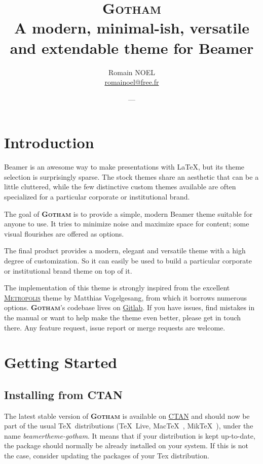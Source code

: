 \documentclass{l3doc}
\title{\textsc{Gotham}\\ A modern, minimal-ish, versatile and extendable theme for Beamer}
\author{Romain NOEL \\ \url{romainoel@free.fr}}
\date{\GothamVersion~---~\GothamDate}
\providecommand{\themename}{\textbf{\textsc{Gotham}}\xspace}
\begin{document}
\maketitle
\tableofcontents


\section{Introduction}
	Beamer is an awesome way to make presentations with \LaTeX, but its theme selection is surprisingly sparse.
	The stock themes share an aesthetic that can be a little cluttered, while the few distinctive custom themes available are often specialized for a particular corporate or institutional brand.

	The goal of \themename is to provide a simple, modern Beamer theme suitable for anyone to use.
	It tries to minimize noise and maximize space for content; some visual flourishes are offered as options.

	The final product provides a modern, elegant and versatile theme with a	high degree of customization.
	So it can easily be used to build a particular corporate or institutional brand theme on top of it.

	The implementation of this theme is strongly inspired from the excellent \href{https://github.com/matze/mtheme}{\textsc{Metropolis}} theme by Matthias Vogelgesang, from which it borrows numerous options.
	\themename's codebase lives on
	\href{https://gitlab.com/RomainNOEL/beamertheme-gotham} {Gitlab}.
	\newline
	If you have issues, find mistakes in the manual or want to help make the theme even better, please get in touch there.
	Any feature request, issue report or merge requests are welcome.


\section{Getting Started}
\subsection{Installing from CTAN}
	The latest stable version of \themename is available on
	\href{https://ctan.org/pkg/beamertheme-gotham}{CTAN} and should now be part of the usual \TeX\ distributions (\TeX\ Live, Mac\TeX\ , Mik\TeX\ ), under the name	\textit{beamertheme-gotham}.
	It means that if your distribution is kept up-to-date, the package should normally be already installed on your system.
	If this is not the case, consider updating the packages of your Tex distribution.
\end{document}
